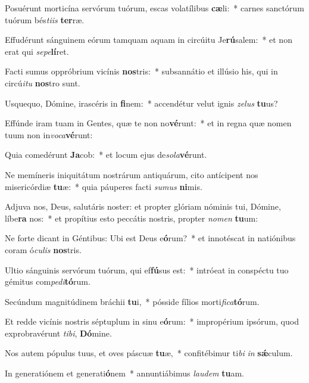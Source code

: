 \item Posuérunt morticína servórum tuórum, escas volatílibus \textbf{cæ}li:~* carnes sanctórum tuórum bés\textit{ti}\textit{is} \textbf{ter}ræ.
\item Effudérunt sánguinem eórum tamquam aquam in circúitu Je\textbf{rú}salem:~* et non erat qui \textit{se}\textit{pe}\textbf{lí}ret.
\item Facti sumus oppróbrium vicínis \textbf{nos}tris:~* subsannátio et illúsio his, qui in circú\textit{i}\textit{tu} \textbf{nos}tro sunt.
\item Usquequo, Dómine, irascéris in \textbf{fi}nem:~* accendétur velut ignis \textit{ze}\textit{lus} \textbf{tu}us?
\item Effúnde iram tuam in Gentes, quæ te non no\textbf{vé}runt:~* et in regna quæ nomen tuum non in\textit{vo}\textit{ca}\textbf{vé}runt:
\item Quia comedérunt \textbf{Ja}cob:~* et locum ejus de\textit{so}\textit{la}\textbf{vé}runt.
\item Ne memíneris iniquitátum nostrárum antiquárum, cito antícipent nos misericórdiæ \textbf{tu}æ:~* quia páuperes facti \textit{su}\textit{mus} \textbf{ni}mis.
\item Adjuva nos, Deus, salutáris noster: et propter glóriam nóminis tui, Dómine, líbe\textbf{ra} nos:~* et propítius esto peccátis nostris, propter \textit{no}\textit{men} \textbf{tu}um:
\item Ne forte dicant in Géntibus: Ubi est Deus e\textbf{ó}rum?~* et innotéscat in natiónibus coram ó\textit{cu}\textit{lis} \textbf{nos}tris.
\item Ultio sánguinis servórum tuórum, qui ef\textbf{fú}sus est:~* intróeat in conspéctu tuo gémitus com\textit{pe}\textit{di}\textbf{tó}rum.
\item Secúndum magnitúdinem bráchii \textbf{tu}i,~* pósside fílios morti\textit{fi}\textit{ca}\textbf{tó}rum.
\item Et redde vicínis nostris séptuplum in sinu e\textbf{ó}rum:~* impropérium ipsórum, quod exprobravérunt \textit{ti}\textit{bi}, \textbf{Dó}mine.
\item Nos autem pópulus tuus, et oves páscuæ \textbf{tu}æ,~* confitébimur ti\textit{bi} \textit{in} \textbf{sǽ}culum.
\item In generatiónem et generati\textbf{ó}nem~* annuntiábimus \textit{lau}\textit{dem} \textbf{tu}am.
